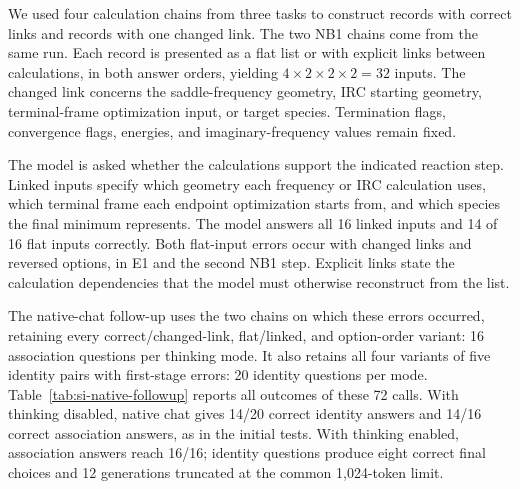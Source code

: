 We used four calculation chains from three tasks to construct records with correct links and records with one changed link. The two NB1 chains come from the same run. Each record is presented as a flat list or with explicit links between calculations, in both answer orders, yielding $4\times2\times2\times2=32$ inputs. The changed link concerns the saddle-frequency geometry, IRC starting geometry, terminal-frame optimization input, or target species. Termination flags, convergence flags, energies, and imaginary-frequency values remain fixed.

The model is asked whether the calculations support the indicated reaction step. Linked inputs specify which geometry each frequency or IRC calculation uses, which terminal frame each endpoint optimization starts from, and which species the final minimum represents. The model answers all 16 linked inputs and 14 of 16 flat inputs correctly. Both flat-input errors occur with changed links and reversed options, in E1 and the second NB1 step. Explicit links state the calculation dependencies that the model must otherwise reconstruct from the list.\citep{ref17}

The native-chat follow-up uses the two chains on which these errors occurred, retaining every correct/changed-link, flat/linked, and option-order variant: 16 association questions per thinking mode. It also retains all four variants of five identity pairs with first-stage errors: 20 identity questions per mode. Table~\ref{tab:si-native-followup} reports all outcomes of these 72 calls. With thinking disabled, native chat gives 14/20 correct identity answers and 14/16 correct association answers, as in the initial tests. With thinking enabled, association answers reach 16/16; identity questions produce eight correct final choices and 12 generations truncated at the common 1,024-token limit.

